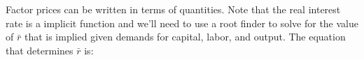 \documentclass[letterpaper,12pt]{article}
\theoremstyle{definition}
\begin{document}
\begin{spacing}{1.5}
%
%


Factor prices can be written in terms of quantities.  Note that the real interest rate is a implicit function and we'll need to use a root finder to solve for the value of $\bar{r}$ that is implied given demands for capital, labor, and output.  The equation that determines $\bar{r}$ is:


\end{spacing}
\end{document}
